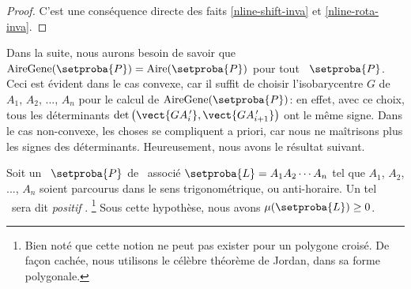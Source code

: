 \begin{proof}
    C'est une conséquence directe des faits \ref{nline-shift-inva} et \ref{nline-rota-inva}.
\end{proof}




Dans la suite, nous aurons besoin de savoir que 
$\garea{\setproba{P}} = \area{\setproba{P}}$ pour tout \ngone\ $\setproba{P}$.%
Ceci est évident dans le cas convexe, car il suffit de choisir l'isobarycentre $G$ de $A_1$, $A_2$, ..., $A_n$ pour le calcul de $\garea{\setproba{P}}$: en effet, avec ce choix, tous les déterminants $\det \big( \vect{G A^{\,\prime}_i} , \vect{G A^{\,\prime}_{i+1}} \big)$ ont le même signe.
Dans le cas non-convexe, les choses se compliquent a priori, car nous ne maîtrisons plus les signes des déterminants. Heureusement, nous avons le résultat suivant.


\begin{fact} \label{route-direction}
    Soit un \ngone\ $\setproba{P}$ de \ncycle\ associé $\setproba{L} = A_1 A_2 \cdots A_n$ tel que $A_1$, $A_2$, ..., $A_n$ soient parcourus dans le sens trigonométrique, ou anti-horaire.
    Un tel \ncycle\ sera dit \og \emph{positif} \fg.%
    \footnote{
    	Bien noté que cette notion ne peut pas exister pour un polygone croisé. De façon cachée, nous utilisons le célèbre théorème de Jordan, dans sa forme polygonale.
    }
    Sous cette hypothèse, nous avons $\mu(\setproba{L}) \geq 0$.
\end{fact}


